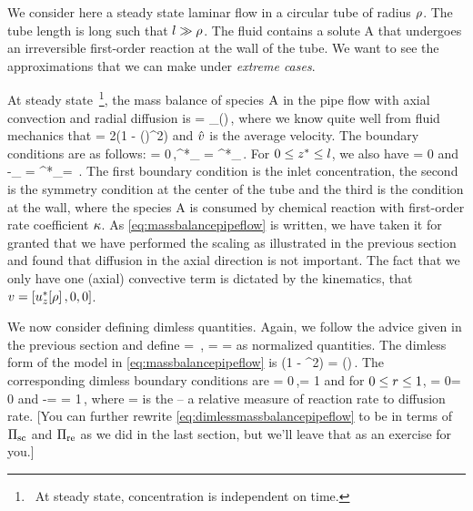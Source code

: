 We consider here a steady state laminar flow in a circular tube of radius $\rho$. The tube length is long such that $l\gg\rho$. The fluid contains a solute \ce A that undergoes an irreversible first-order reaction at the wall of the tube. We want to see the approximations that we can make under \emph{extreme cases}.

At steady state~\footnote{~At steady state, concentration is independent on time.}, the mass balance of species $\ce A$ in the pipe flow with axial convection and radial diffusion is
\bneq\label{eq:massbalancepipeflow}
\vela{} = \kmdiff_\left(\xpd{}{\posr}{\posr}\right)\,,
\eneq
where we know quite well from fluid mechanics that
\beq
\vela = 2\hat{\lvel}\left(1 - \left(\dfrac{\posr}{\rradius}\right)^2\right)
\eeq
and $\hat{v}$ is the average velocity. The boundary conditions are as follows:
\bneq\label{eq:boundaryconditionsmassbalancepipeflow}
 \posz = 0\,,\quad\conc^*_ = \conc^*_\quad{}\posr\rradius\,.
\eneq
For ${0}\leq{z^*}\leq{l}$, we also have
\beq
{}\quad{}\posr = 0
\eeq
and
\beq
-\kmdiff_ = \kforcoeff\conc^*_\quad{}\posr = \rradius\,.
\eeq
The first boundary condition is the inlet concentration, the second is the symmetry condition at the center of the tube and the third is the condition at the wall, where the species \ce A is consumed by chemical reaction with first-order rate coefficient $\kappa$. As \cref{eq:massbalancepipeflow} is written, we have taken it for granted that we have performed the scaling as illustrated in the previous section and found that diffusion in the axial direction is not important. The fact that we only have one (axial) convective term is dictated by the kinematics, that $v = \left[{u^*_z\!\left[{\rho}\right],0,0}\right]$.

We now consider defining dimless quantities. Again, we follow the advice given in the previous section and define
\beq
\conc = \,,\quad
\ndposr = \dfrac{\posr}{\rradius}\quad{}\quad
\ndposz = \dfrac{\posz}{\length}
\eeq
as normalized quantities. The dimless form of the model in \cref{eq:massbalancepipeflow} is
\bneq\label{eq:dimlessmassbalancepipeflow}
\left(1 - \ndposr^2\right) \xpd{\conc}{\ndposz} = 
    \left(\xpd{}\ndposr\ndposr\xpd\conc\ndposr\right)\,.
\eneq
The corresponding dimless boundary conditions are
\beq
{}\ndposz = 0\,,\quad\conc = 1\quad{}
\eeq
and for ${0}\leq{r}\leq{1}$,
\beq
\xpd\conc\ndposr = 0\quad{}\ndposr = 0
\eeq
and
\bneq\label{eq:dimlessconcentrationgradient}
-\xpd\conc\ndposr = \kdamkohler\conc\quad{}\ndposr = 1\,,
\eneq
where
\beq
\kdamkohler = 
\eeq
is the  -- a relative measure of reaction rate to diffusion rate. [You can further rewrite \cref{eq:dimlessmassbalancepipeflow} to be in terms of $\Pi_\text{sc}$ and $\Pi_\text{re}$ as we did in the last section, but we'll leave that as an exercise for you.]

